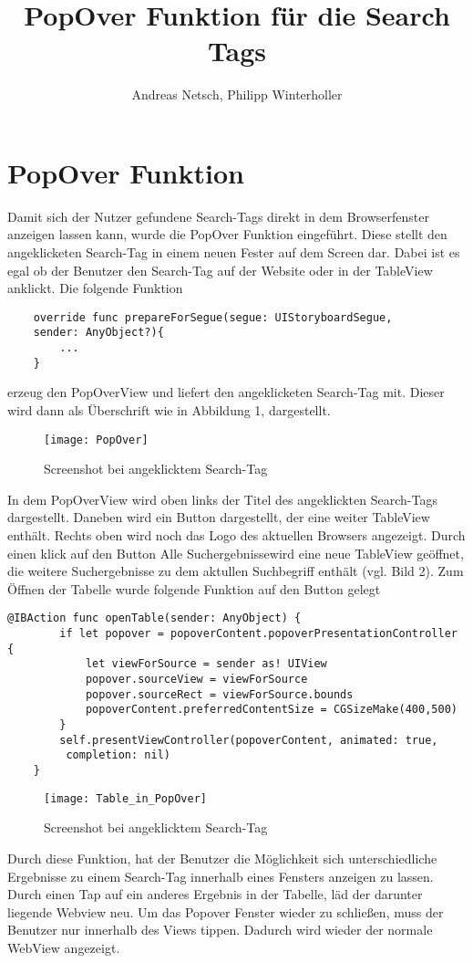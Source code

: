 \documentclass[a4paper,12pt]{article}
\title{PopOver Funktion für die Search Tags}
\author{Andreas Netsch, Philipp Winterholler}
\begin{document}
\section{PopOver Funktion}

Damit sich der Nutzer gefundene Search-Tags direkt in dem Browserfenster anzeigen lassen kann, wurde die PopOver Funktion eingeführt. Diese stellt den angeklicketen Search-Tag in einem neuen Fester auf dem Screen dar. Dabei ist es egal ob der Benutzer den Search-Tag auf der Website oder in der TableView anklickt.
Die folgende Funktion 
\begin{lstlisting}
    override func prepareForSegue(segue: UIStoryboardSegue, 
    sender: AnyObject?){
        ...
    }
\end{lstlisting}

erzeug den PopOverView und liefert den angeklicketen Search-Tag mit. Dieser wird dann als Überschrift wie in Abbildung 1, dargestellt. 
\begin{figure}[htb]
    \centering
    \texttt{[image: PopOver]}
    \caption{Screenshot bei angeklicktem Search-Tag}
\end{figure}
In dem PopOverView wird oben links der Titel des angeklickten Search-Tags dargestellt. Daneben wird ein Button dargestellt, der eine weiter TableView enthält. Rechts oben wird noch das Logo des aktuellen Browsers angezeigt. Durch einen klick auf den Button \glqq Alle Suchergebnisse\grqq  wird eine neue TableView geöffnet, die weitere Suchergebnisse zu dem aktullen Suchbegriff enthält (vgl. Bild 2). Zum Öffnen der Tabelle wurde folgende Funktion auf den Button gelegt
\begin{lstlisting}
@IBAction func openTable(sender: AnyObject) {
        if let popover = popoverContent.popoverPresentationController {
            let viewForSource = sender as! UIView
            popover.sourceView = viewForSource
            popover.sourceRect = viewForSource.bounds
            popoverContent.preferredContentSize = CGSizeMake(400,500)
        }        
        self.presentViewController(popoverContent, animated: true,
         completion: nil)
    }
\end{lstlisting}
\begin{figure}[htb]
    \centering
    \texttt{[image: Table\_in\_PopOver]}
    \caption{Screenshot bei angeklicktem Search-Tag}
\end{figure}
Durch diese Funktion, hat der Benutzer die Möglichkeit sich unterschiedliche Ergebnisse zu einem Search-Tag innerhalb eines Fensters anzeigen zu lassen. Durch einen Tap auf ein anderes Ergebnis in der Tabelle, läd der darunter liegende Webview neu. Um das Popover Fenster wieder zu schließen, muss der Benutzer nur innerhalb des Views tippen. Dadurch wird wieder der normale WebView angezeigt.
\end{document}
